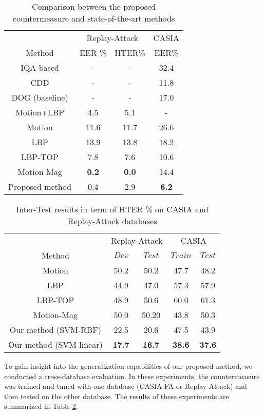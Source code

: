 \documentclass{article}
\begin{document}
\vspace{-4mm}
		\begin{table}[h]
		\small
			\centering
	\caption{Comparison between the proposed countermeasure and state-of-the-art methods}
\label{comp}
	\setlength{\tabcolsep}{0.35cm}
		\begin{tabular}{|c|c|c|c|}
		\hline
	       & \multicolumn{2}{c|}{Replay-Attack} & CASIA\\
			\cline{2-4}
	    Method & EER \% & HTER\%& EER\%\\
			\hline \hline
			IQA based \cite{IQA}&- &- & 32.4\\
			\hline
			CDD \cite{low_level_high_level}& - & - & 11.8\\
			\hline
			DOG (baseline)\cite{casia}& - & -&17.0\\
			\hline						
			Motion+LBP \cite{motion_lbp}& 4.5 & 5.1&- \\
			\hline 
			Motion \cite{motion_casia}&11.6 &11.7&26.6 \\
					\hline 
			LBP \cite{replay}& 13.9 & 13.8&18.2 \\
			\hline 
			LBP-TOP \cite{lbp_top_replay}& 7.8   & 7.6&10.6 \\
			\hline 
			Motion Mag \cite{motion_mag}& \textbf{0.2}& \textbf{0.0}&14.4 \\
			\hline 
\hline 
			Proposed method&  0.4 & 2.9&\textbf{6.2}\\
			\hline
	 \end{tabular}	
	\end{table} 
\vspace{-3mm}
		\begin{table}[h]
			\centering
	\caption{Inter-Test results in term of  HTER \%  on CASIA and Replay-Attack databases}
		\small
	\label{cross_database}
	\setlength{\tabcolsep}{0.22cm}
		\begin{tabular}{|c|c|c|c|c|}
		\hline
		 & \multicolumn{2}{c|}{Replay-Attack}&\multicolumn{2}{c|}{CASIA }\\
		\cline{2-5}
		Method& $Dev$&$Test$&$Train$&$Test$\\
		\hline
     Motion\cite{motion_casia}&50.2&50.2&47.7&48.2\\
    \hline
    LBP \cite{motion_casia}&44.9&47.0&57.3&57.9\\
    \hline
    LBP-TOP \cite{motion_casia}&48.9&50.6&60.0&61.3\\
    \hline
		Motion-Mag\cite{motion_mag}&50.0&50.20&43.8&50.3\\
		 \hline
\hline
		Our method (SVM-RBF)&22.5 &20.6 &47.5&43.9\\
		    \hline
			Our method (SVM-linear)&\textbf{17.7}&\textbf{16.7}&\textbf{38.6}&\textbf{37.6}\\
		    \hline
	 \end{tabular}	
	\end{table} 	
	To gain insight into the generalization capabilities of our proposed method, we conducted a cross-database evaluation. In these experiments, the countermeasure was trained and tuned with one database (CASIA-FA or Replay-Attack) and then tested on the other database. The results of these experiments are summarized in Table \ref{cross_database}. 
\end{document}
